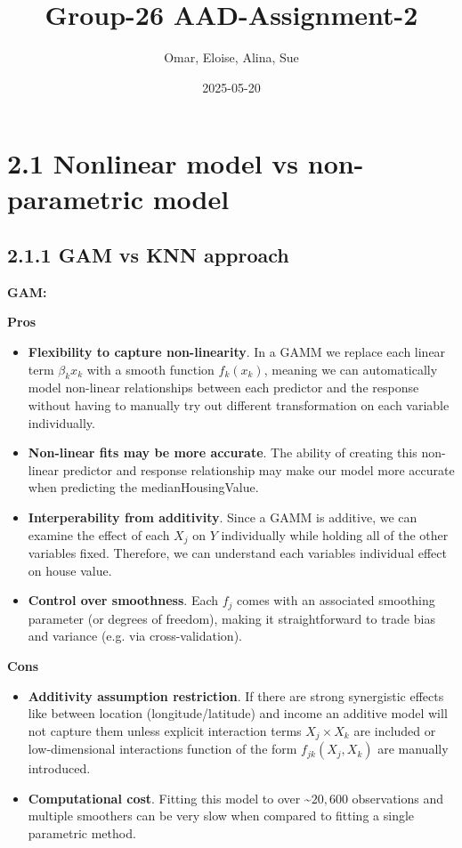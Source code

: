 \documentclass[
]{article}
\title{Group-26 AAD-Assignment-2}
\author{Omar, Eloise, Alina, Sue}
\date{2025-05-20}
\begin{document}
\maketitle

{
\setcounter{tocdepth}{4}
\tableofcontents
}
\section{2.1 Nonlinear model vs non-parametric
model}\label{nonlinear-model-vs-non-parametric-model}

\subsection{2.1.1 GAM vs KNN approach}\label{gam-vs-knn-approach}

\noindent \large \textbf{GAM:} \normalsize

\noindent \textbf{Pros}

\begin{itemize}
  \item \textbf{Flexibility to capture non-linearity}. In a GAMM we replace each linear term $\beta_{k} x_{k}$ with a smooth function $f_{k}(x_{k})$,     meaning we can automatically model non-linear relationships between each predictor and the response without having to manually try out different      transformation on each variable individually.
  \item \textbf{Non-linear fits may be more accurate}. The ability of creating this non-linear predictor and response relationship may make our model     more accurate when predicting the medianHousingValue.
  \item \textbf{Interperability from additivity}. Since a GAMM is additive, we can examine the effect of each $X_j$ on $Y$ individually while holding      all of the other variables fixed. Therefore, we can understand each variables individual effect on house value.
  \item \textbf{Control over smoothness}. Each $f_j$ comes with an associated smoothing parameter (or degrees of freedom), making it straightforward      to trade bias and variance  (e.g. via cross-validation).
\end{itemize}

\noindent \textbf{Cons}

\begin{itemize}
  \item \textbf{Additivity assumption restriction}. If there are strong synergistic effects like between location (longitude/latitude) and income         \textendash an additive model will not capture them unless explicit interaction terms $X_j \times X_k$ are included or low-dimensional               interactions function of the form $f_{jk}(X_j, X_k)$ are manually introduced. 
  \item \textbf{Computational cost}. Fitting this model to over \textasciitilde$20,600$ observations and multiple smoothers can be very slow when        compared to fitting a single parametric method.
\end{itemize}
\end{document}
